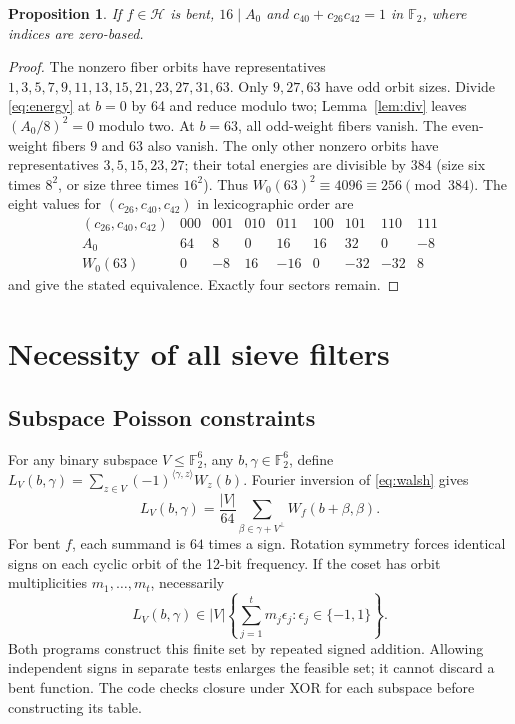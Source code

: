 \documentclass[11pt,a4paper]{article}
\newcommand{\F}{\mathbb F_2}
\newtheorem{proposition}[theorem]{Proposition}
\begin{document}
\begin{proposition}\label{prop:sector}
If $f\in\mathcal H$ is bent, $16\mid A_0$ and
$c_{40}+c_{26}c_{42}=1$ in $\F$, where indices are zero-based.
\end{proposition}
\begin{proof}
The nonzero fiber orbits have representatives
$1,3,5,7,9,11,13,15,21,23,27,31,63$. Only $9,27,63$ have odd
orbit sizes. Divide \eqref{eq:energy} at $b=0$ by 64 and reduce
modulo two; Lemma~\ref{lem:div} leaves $(A_0/8)^2=0$ modulo two.
At $b=63$, all odd-weight fibers vanish. The even-weight fibers
$9$ and $63$ also vanish. The only other nonzero orbits have
representatives $3,5,15,23,27$; their total energies are divisible by
$384$ (size six times $8^2$, or size three times $16^2$).
Thus $W_0(63)^2\equiv4096\equiv256\pmod{384}$.
The eight values for $(c_{26},c_{40},c_{42})$ in lexicographic order are
\[
\begin{array}{c|rrrrrrrr}
(c_{26},c_{40},c_{42})&000&001&010&011&100&101&110&111\\\hline
A_0&64&8&0&16&16&32&0&-8\\
W_0(63)&0&-8&16&-16&0&-32&-32&8
\end{array}
\]
and give the stated equivalence. Exactly four sectors remain.
\end{proof}

\section{Necessity of all sieve filters}
\subsection{Subspace Poisson constraints}
For any binary subspace $V\le\F^6$, any $b,\gamma\in\F^6$, define
$L_V(b,\gamma)=\sum_{z\in V}(-1)^{\langle\gamma,z\rangle}W_z(b)$.
Fourier inversion of \eqref{eq:walsh} gives
\begin{equation}\label{eq:poisson}
 L_V(b,\gamma)=\frac{|V|}{64}
   \sum_{\beta\in\gamma+V^\perp}W_f(b+\beta,\beta).
\end{equation}
For bent $f$, each summand is $64$ times a sign. Rotation symmetry
forces identical signs on each cyclic orbit of the 12-bit frequency.
If the coset has orbit multiplicities $m_1,\ldots,m_t$, necessarily
\begin{equation}\label{eq:allowed}
 L_V(b,\gamma)\in
 |V|\left\{\sum_{j=1}^t m_j\epsilon_j:\epsilon_j\in\{-1,1\}\right\}.
\end{equation}
Both programs construct this finite set by repeated signed addition.
Allowing independent signs in separate tests enlarges the feasible set;
it cannot discard a bent function. The code checks closure under XOR
for each subspace before constructing its table.
\end{document}
